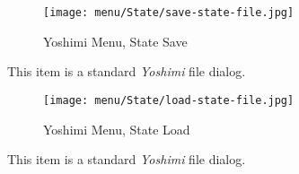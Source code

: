 \begin{figure}[H]
   \centering 
   \texttt{[image: menu/State/save-state-file.jpg]}
   \caption{Yoshimi Menu, State Save}
   \label{fig:yoshimi_menu_state_save}
\end{figure}

   This item is a standard \textsl{Yoshimi} file dialog.

\begin{figure}[H]
   \centering 
   \texttt{[image: menu/State/load-state-file.jpg]}
   \caption{Yoshimi Menu, State Load}
   \label{fig:yoshimi_menu_state_load}
\end{figure}

   This item is a standard \textsl{Yoshimi} file dialog.

